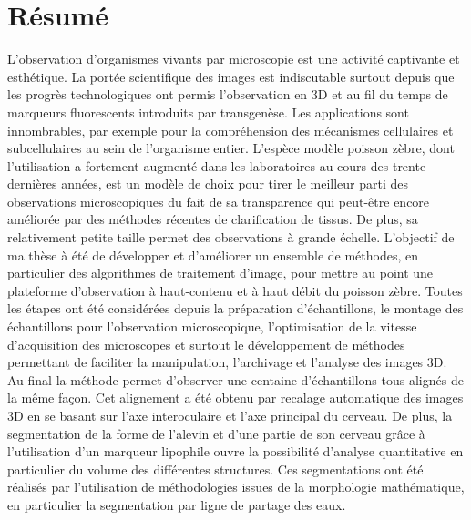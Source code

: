 


\begingroup
\let\clearpage\relax
\let\cleardoublepage\relax
\let\cleardoublepage\relax

\chapter*{Résumé}

L'observation d'organismes vivants par microscopie est une activité captivante et esthétique.
%
La portée scientifique des images est indiscutable surtout depuis que les progrès technologiques ont permis l'observation en 3D et au fil du temps de marqueurs fluorescents introduits par transgenèse. Les applications sont innombrables, par exemple pour la compréhension des mécanismes cellulaires et subcellulaires au sein de l'organisme entier. L'espèce modèle poisson zèbre, dont l'utilisation a fortement augmenté dans les laboratoires au cours des trente dernières années, est un modèle de choix pour tirer le meilleur parti des observations microscopiques du fait de sa transparence qui peut-être encore améliorée par des méthodes récentes de clarification de tissus. De plus, sa relativement petite taille permet des observations à grande échelle.
%
L'objectif de ma thèse à été de développer et d'améliorer un ensemble de méthodes, en particulier des algorithmes de traitement d'image, pour mettre au point une plateforme d'observation à haut-contenu et à haut débit du poisson zèbre. Toutes les étapes ont été considérées depuis la préparation d'échantillons, le montage des échantillons pour l'observation microscopique, l'optimisation de la vitesse d'acquisition des microscopes et surtout le développement de méthodes permettant de faciliter la manipulation, l'archivage et l'analyse des images 3D. Au final la méthode permet d'observer une centaine d'échantillons tous alignés de la même façon.
Cet alignement a été obtenu par recalage automatique des images 3D en se basant sur l'axe interoculaire et l'axe principal du cerveau.
De plus, la segmentation de la forme de l'alevin et d'une partie de son cerveau grâce à l'utilisation d'un marqueur lipophile ouvre la possibilité d'analyse quantitative en particulier du volume des différentes structures.
Ces segmentations ont été réalisés par l'utilisation de méthodologies issues de la morphologie mathématique, en particulier la segmentation par ligne de partage des eaux.

